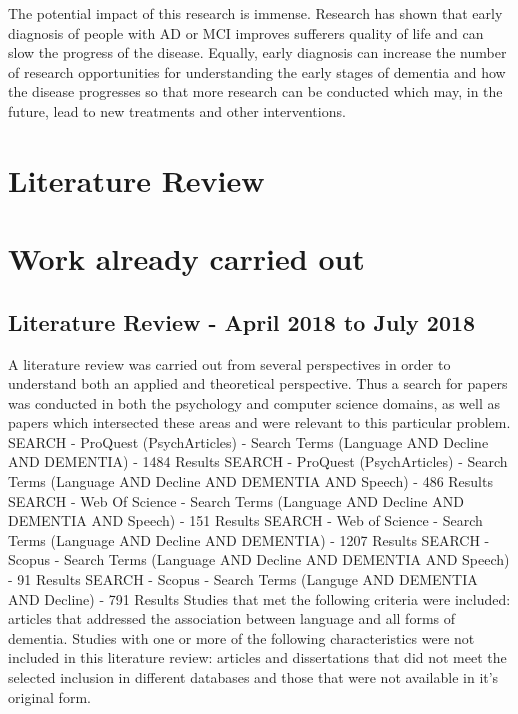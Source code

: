 \documentclass{article}
\begin{document}
	\newline
	\par
	The potential impact of this research is immense. Research has shown that early diagnosis of people with AD or MCI improves sufferers quality of life and can slow the progress of the disease. Equally, early diagnosis can increase the number of research opportunities for understanding the early stages of dementia and how the disease progresses so that more research can be conducted which may, in the future, lead to new treatments and other interventions.
	
	\section{Literature Review}
	
	\section{Work already carried out}
	
	\subsection{Literature Review - April 2018 to July 2018}
	A literature review was carried out from several perspectives in order to understand both an applied and theoretical perspective. Thus a search for papers was conducted in both the psychology and computer science domains, as well as papers which intersected these areas and were relevant to this particular problem.
	\newline
	SEARCH - ProQuest (PsychArticles) - Search Terms (Language AND Decline AND DEMENTIA) - 1484 Results
	SEARCH - ProQuest (PsychArticles) - Search Terms (Language AND Decline AND DEMENTIA AND Speech) - 486 Results
	SEARCH - Web Of Science - Search Terms (Language AND Decline AND DEMENTIA AND Speech) - 151 Results
	SEARCH - Web of Science - Search Terms (Language AND Decline AND DEMENTIA) - 1207 Results
	SEARCH - Scopus - Search Terms (Language AND Decline AND DEMENTIA AND Speech) - 91 Results 
	SEARCH - Scopus - Search Terms (Languge AND DEMENTIA AND Decline) - 791 Results
	\newline
	Studies that met the following criteria were included: articles that addressed the association between language and all forms of dementia. Studies with one or more of the following characteristics were not included in this literature review: articles and dissertations that did not meet the selected inclusion in different databases and those that were not available in it's original form. 	
		
\end{document}
